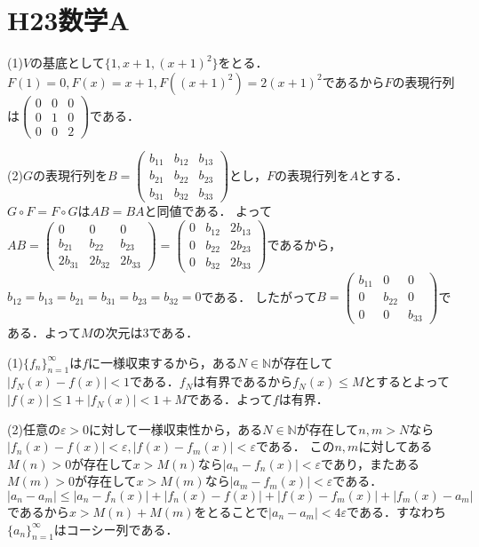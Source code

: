 \documentclass[
		book,
		head_space=20mm,
		foot_space=20mm,
		gutter=10mm,
		line_length=190mm
]{jlreq}
\begin{document}
\section{H23数学A}
(1)$V$の基底として$\{1,x+1,(x+1)^2\}$をとる．
$F(1)=0,F(x)=x+1,F((x+1)^2)=2(x+1)^2$であるから$F$の表現行列は$\begin{pmatrix}
    0 & 0 & 0 \\
    0 & 1 & 0 \\
    0 & 0 & 2
\end{pmatrix}$である．

(2)$G$の表現行列を$B=\begin{pmatrix}
    b_{11} & b_{12} & b_{13} \\
    b_{21} & b_{22} & b_{23} \\
    b_{31} & b_{32} & b_{33}
\end{pmatrix}$とし，$F$の表現行列を$A$とする．
$G\circ F = F \circ G$は$AB=BA$と同値である．
よって$AB=\begin{pmatrix}
    0 & 0 & 0 \\
    b_{21} & b_{22} & b_{23} \\
    2b_{31} & 2b_{32} & 2b_{33}
\end{pmatrix}=\begin{pmatrix}
    0 & b_{12} & 2b_{13} \\
    0 & b_{22} & 2b_{23} \\
    0 & b_{32} & 2b_{33}
\end{pmatrix}$であるから，$b_{12}=b_{13}=b_{21}=b_{31}=b_{23}=b_{32}=0$である．
したがって$B=\begin{pmatrix}
    b_{11} & 0 & 0 \\
    0 & b_{22} & 0 \\
    0 & 0 & b_{33}
\end{pmatrix}$である．よって$M$の次元は$3$である．

(1)$\{f_n\}_{n=1}^\infty$は$f$に一様収束するから，ある$N\in \mathbb{N}$が存在して$|f_N(x)-f(x)|<1$である．$f_N$は有界であるから$f_N(x)\le M$とするとよって$|f(x)|\le1+|f_N(x)|<1+M$である．よって$f$は有界．

(2)任意の$\varepsilon>0$に対して一様収束性から，ある$N\in \mathbb{N}$が存在して$n,m>N$なら$|f_n(x)-f(x)|<\varepsilon,|f(x)-f_m(x)|<\varepsilon$である．
この$n,m$に対してある$M(n)>0$が存在して$x > M(n)$なら$|a_n-f_n(x)|<\varepsilon$であり，またある$M(m)>0$が存在して$x > M(m)$なら$|a_m -f_m(x)|<\varepsilon$である．
$|a_n-a_m|\le|a_n -f_n(x)|+|f_n(x)-f(x)|+|f(x)-f_m(x)|+|f_m(x)-a_m|$であるから$x>M(n)+M(m)$をとることで$|a_n-a_m|<4\varepsilon$である．すなわち$\{a_n\}_{n=1}^\infty$はコーシー列である．
\end{document}

